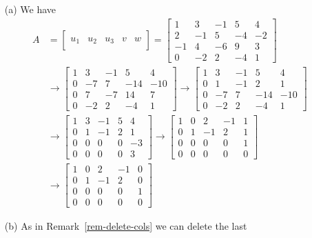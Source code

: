 \documentclass[a4paper]{amsart}
\renewenvironment{solution}{\SolutionInline}{\endSolutionInline}
\begin{document}
\begin{solution}
 \begin{itemize}
  \item[(a)] We have
   \begin{align*}
    A  & =
     \left[\begin{array}{c|c|c|c|c}
      &&&&\\u_1&u_2&u_3&v&w\\&&&&
     \end{array}\right]
     =
     \left[\begin{array}{ccccc}
      1&3&-1&5&4\\2&-1&5&-4&-2\\-1&4&-6&9&3\\0&-2&2&-4&1
     \end{array}\right]\\
   & \to
     \left[\begin{array}{ccccc}
      1&3&-1&5&4\\0&-7&7&-14&-10\\0&7&-7&14&7\\0&-2&2&-4&1
     \end{array}\right]
     \to
     \left[\begin{array}{ccccc}
      1&3&-1&5&4\\0&1&-1&2&1\\0&-7&7&-14&-10\\0&-2&2&-4&1
     \end{array}\right]\\
   & \to
     \left[\begin{array}{ccccc}
      1&3&-1&5&4\\0&1&-1&2&1\\0&0&0&0&-3\\0&0&0&0&3
     \end{array}\right]
     \to
     \left[\begin{array}{ccccc}
      1&0&2&-1&1\\0&1&-1&2&1\\0&0&0&0&1\\0&0&0&0&0
     \end{array}\right]\\
   & \to
     \left[\begin{array}{ccccc}
      1&0&2&-1&0\\0&1&-1&2&0\\0&0&0&0&1\\0&0&0&0&0
     \end{array}\right]
   \end{align*}
  \item[(b)] As in Remark~\ref{rem-delete-cols} we can delete the last

\end{itemize}
\end{solution}
\end{document}
